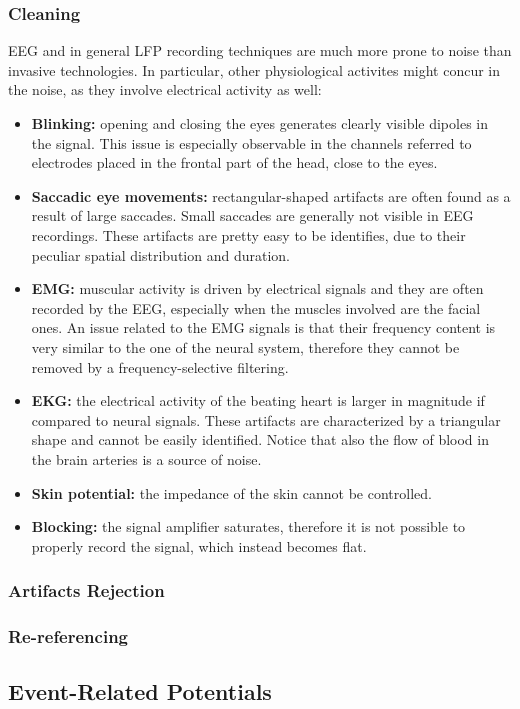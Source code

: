 \subsubsection{Cleaning}
EEG and in general LFP recording techniques are much more prone to noise than
invasive technologies. In particular, other physiological activites might concur
in the noise, as they involve electrical activity as well:
\begin{itemize}
    \item \textbf{Blinking:} opening and closing the eyes generates clearly visible dipoles
    in the signal. This issue is especially observable in the channels referred to
    electrodes placed in the frontal part of the head, close to the eyes.
    \item \textbf{Saccadic eye movements:} rectangular-shaped artifacts are often found as a
    result of large saccades. Small saccades are generally not visible in EEG
    recordings. These artifacts are pretty easy to be identifies, due to their
    peculiar spatial distribution and duration.
    \item \textbf{EMG:} muscular activity is driven by electrical signals and they are often
    recorded by the EEG, especially when the muscles involved are the facial ones.
    An issue related to the EMG signals is that their frequency content is very similar
    to the one of the neural system, therefore they cannot be removed by a
    frequency-selective filtering.
    \item \textbf{EKG:} the electrical activity of the beating heart is larger in magnitude
    if compared to neural signals. These artifacts are characterized by a
    triangular shape and cannot be easily identified. Notice that also the flow of
    blood in the brain arteries is a source of noise.
    \item \textbf{Skin potential:} the impedance of the skin cannot be controlled.
    \item \textbf{Blocking:} the signal amplifier saturates, therefore it is not possible
    to properly record the signal, which instead becomes flat.
\end{itemize}
\subsubsection{Artifacts Rejection}
\subsubsection{Re-referencing}

\subsection{Event-Related Potentials}
